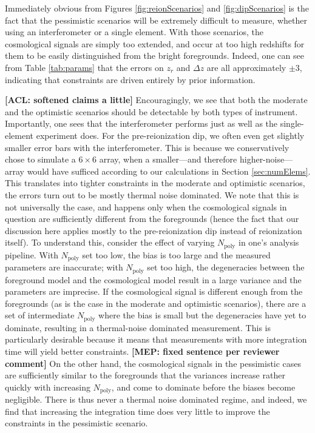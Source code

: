 \documentclass[twocolumn,apj,numberedappendix]{emulateapj}
\newcommand{\acl}[1]{{\color{red} \textbf{[ACL:  #1]}}}
\newcommand{\mep}[1]{{\color{applegreen} \textbf{[MEP:  #1]}}}
\begin{document}
Immediately obvious from Figures \ref{fig:reionScenarios} and \ref{fig:dipScenarios} is the fact that the pessimistic scenarios will be extremely difficult to measure, whether using an interferometer or a single element. With those scenarios, the cosmological signals are simply too extended, and occur at too high redshifts for them to be easily distinguished from the bright foregrounds. Indeed, one can see from Table \ref{tab:params} that the errors on $z_r$ and $\Delta z$ are all approximately $\pm 3$, indicating that constraints are driven entirely by prior information.

\acl{softened claims a little} Encouragingly, we see that both the moderate and the optimistic scenarios should be detectable by both types of instrument. Importantly, one sees that the interferometer performs just as well as the single-element experiment does. For the pre-reionization dip, we often even get slightly smaller error bars with the interferometer. This is because we conservatively chose to simulate a $6\times 6$ array, when a smaller---and therefore higher-noise---array would have sufficed according to our calculations in Section \ref{sec:numElems}. This translates into tighter constraints in the moderate and optimistic scenarios, the errors turn out to be mostly thermal noise dominated. We note that this is not universally the case, and happens only when the cosmological signals in question are sufficiently different from the foregrounds (hence the fact that our discussion here applies mostly to the pre-reionization dip instead of reionization itself). To understand this, consider the effect of varying $N_\textrm{poly}$ in one's analysis pipeline. With $N_\textrm{poly}$ set too low, the bias is too large and the measured parameters are inaccurate; with $N_\textrm{poly}$ set too high, the degeneracies between the foreground model and the cosmological model result in a large variance and the parameters are imprecise. If the cosmological signal is different enough from the foregrounds (as is the case in the moderate and optimistic scenarios), there are a set of intermediate $N_\textrm{poly}$ where the bias is small but the degeneracies have yet to dominate, resulting in a thermal-noise dominated measurement. This is particularly desirable because it means that measurements with more integration time will yield better constraints. \mep{fixed sentence per reviewer comment} On the other hand, the cosmological signals in the pessimistic cases are sufficiently similar to the foregrounds that the variances increase rather quickly with increasing $N_\textrm{poly}$, and come to dominate before the biases become negligible. There is thus never a thermal noise dominated regime, and indeed, we find that increasing the integration time does very little to improve the constraints in the pessimistic scenario.
\end{document}
